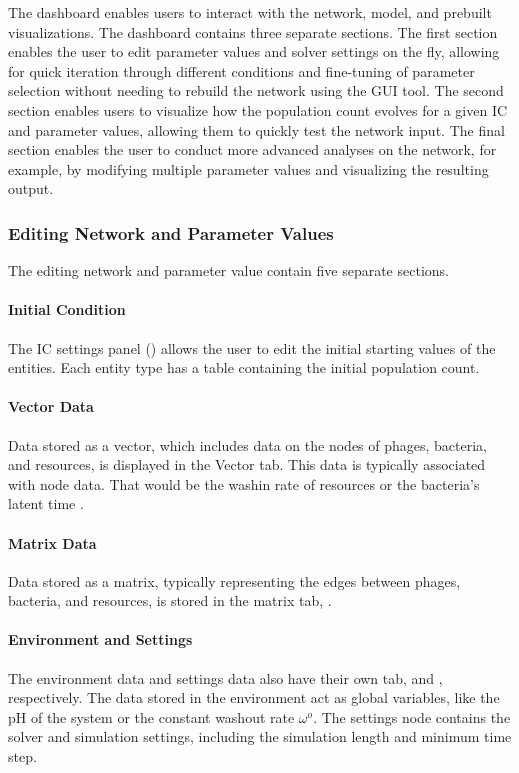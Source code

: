 The dashboard enables users to interact with the network, model, and prebuilt visualizations. The dashboard contains three separate sections.
The first section enables the user to edit parameter values and solver settings on the fly, allowing for quick iteration through different conditions and fine-tuning of parameter selection without needing to rebuild the network using the GUI tool.
The second section enables users to visualize how the population count evolves for a given IC and parameter values, allowing them to quickly test the network input.
The final section enables the user to conduct more advanced analyses on the network, for example, by modifying multiple parameter values and visualizing the resulting output. 

\subsubsection{Editing Network and Parameter Values}
\label{sec:editing_network_and_parameter_values}
The editing network and parameter value contain five separate sections.
\paragraph{Initial Condition}
The IC settings panel () allows the user to edit the initial starting values of the entities. 
Each entity type has a table containing the initial population count. 
\paragraph{Vector Data} 
Data stored as a vector, which includes data on the nodes of phages, bacteria, and resources, is displayed in the Vector tab. 
This data is typically associated with node data. 
That would be the washin rate of resources or the bacteria’s latent time .

\paragraph{Matrix Data}
Data stored as a matrix, typically representing the edges between phages, bacteria, and resources, is stored in the matrix tab, .

\paragraph{Environment and Settings}
The environment data and settings data also have their own tab,  and , respectively. 
The data stored in the environment act as global variables, like the pH of the system or the constant washout rate $\omega^o$. 
The settings node contains the solver and simulation settings, including the simulation length and minimum time step. 


